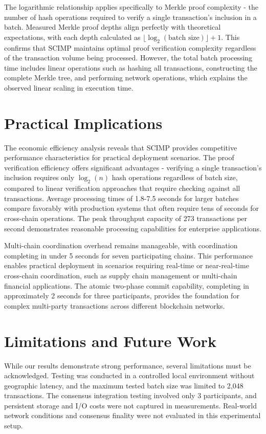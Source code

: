The logarithmic relationship applies specifically to Merkle proof complexity - the number of hash operations required to verify a single transaction's inclusion in a batch. Measured Merkle proof depths align perfectly with theoretical expectations, with each depth calculated as $\lfloor \log_2(\text{batch size}) \rfloor + 1$. This confirms that SCIMP maintains optimal proof verification complexity regardless of the transaction volume being processed. However, the total batch processing time includes linear operations such as hashing all transactions, constructing the complete Merkle tree, and performing network operations, which explains the observed linear scaling in execution time.

\section{Practical Implications}

The economic efficiency analysis reveals that SCIMP provides competitive performance characteristics for practical deployment scenarios. The proof verification efficiency offers significant advantages - verifying a single transaction's inclusion requires only $\log_2(n)$ hash operations regardless of batch size, compared to linear verification approaches that require checking against all transactions. Average processing times of 1.8-7.5 seconds for larger batches compare favorably with production systems that often require tens of seconds for cross-chain operations. The peak throughput capacity of 273 transactions per second demonstrates reasonable processing capabilities for enterprise applications.

Multi-chain coordination overhead remains manageable, with coordination completing in under 5 seconds for seven participating chains. This performance enables practical deployment in scenarios requiring real-time or near-real-time cross-chain coordination, such as supply chain management or multi-chain financial applications. The atomic two-phase commit capability, completing in approximately 2 seconds for three participants, provides the foundation for complex multi-party transactions across different blockchain networks.

\section{Limitations and Future Work}

While our results demonstrate strong performance, several limitations must be acknowledged. Testing was conducted in a controlled local environment without geographic latency, and the maximum tested batch size was limited to 2,048 transactions. The consensus integration testing involved only 3 participants, and persistent storage and I/O costs were not captured in measurements. Real-world network conditions and consensus finality were not evaluated in this experimental setup.

